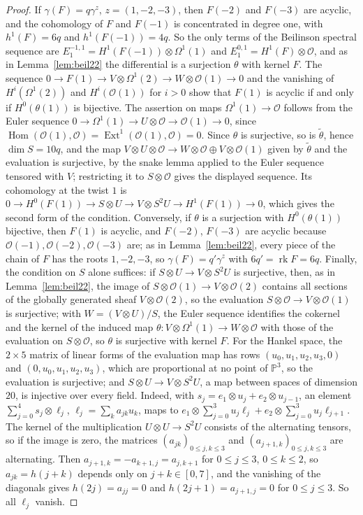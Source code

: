 \documentclass[11pt]{amsart}
\theoremstyle{definition}
\theoremstyle{remark}
\newcommand{\PP}{\mathbb{P}}
\newcommand{\OO}{\mathcal{O}}
\DeclareMathOperator{\rk}{rk}
\DeclareMathOperator{\Ext}{Ext}
\begin{document}
\begin{proof}
If $\gamma(F)=q\gamma^z$, $z=(1,-2,-3)$, then $F(-2)$ and $F(-3)$ are acyclic, and the cohomology of $F$ and $F(-1)$ is concentrated in degree one, with $h^1(F)=6q$ and $h^1(F(-1))=4q$. So the only terms of the Beilinson spectral sequence are $E_1^{-1,1}=H^1(F(-1))\otimes\Omega^1(1)$ and $E_1^{0,1}=H^1(F)\otimes\OO$, and as in Lemma~\ref{lem:beil22} the differential is a surjection $\theta$ with kernel $F$. The sequence $0\to F(1)\to V\otimes\Omega^1(2)\to W\otimes\OO(1)\to0$ and the vanishing of $H^i(\Omega^1(2))$ and $H^i(\OO(1))$ for $i>0$ show that $F(1)$ is acyclic if and only if $H^0(\theta(1))$ is bijective. The assertion on maps $\Omega^1(1)\to\OO$ follows from the Euler sequence $0\to\Omega^1(1)\to U\otimes\OO\to\OO(1)\to0$, since $\operatorname{Hom}(\OO(1),\OO)=\Ext^1(\OO(1),\OO)=0$. Since $\theta$ is surjective, so is $\tilde\theta$, hence $\dim S=10q$, and the map $V\otimes U\otimes\OO\to W\otimes\OO\oplus V\otimes\OO(1)$ given by $\tilde\theta$ and the evaluation is surjective, by the snake lemma applied to the Euler sequence tensored with $V$; restricting it to $S\otimes\OO$ gives the displayed sequence. Its cohomology at the twist $1$ is $0\to H^0(F(1))\to S\otimes U\to V\otimes S^2U\to H^1(F(1))\to0$, which gives the second form of the condition. Conversely, if $\theta$ is a surjection with $H^0(\theta(1))$ bijective, then $F(1)$ is acyclic, and $F(-2)$, $F(-3)$ are acyclic because $\OO(-1),\OO(-2),\OO(-3)$ are; as in Lemma~\ref{lem:beil22}, every piece of the chain of $F$ has the roots $1,-2,-3$, so $\gamma(F)=q'\gamma^z$ with $6q'=\rk F=6q$. Finally, the condition on $S$ alone suffices: if $S\otimes U\to V\otimes S^2U$ is surjective, then, as in Lemma~\ref{lem:beil22}, the image of $S\otimes\OO(1)\to V\otimes\OO(2)$ contains all sections of the globally generated sheaf $V\otimes\OO(2)$, so the evaluation $S\otimes\OO\to V\otimes\OO(1)$ is surjective; with $W=(V\otimes U)/S$, the Euler sequence identifies the cokernel and the kernel of the induced map $\theta\colon V\otimes\Omega^1(1)\to W\otimes\OO$ with those of the evaluation on $S\otimes\OO$, so $\theta$ is surjective with kernel $F$. For the Hankel space, the $2\times5$ matrix of linear forms of the evaluation map has rows $(u_0,u_1,u_2,u_3,0)$ and $(0,u_0,u_1,u_2,u_3)$, which are proportional at no point of $\PP^3$, so the evaluation is surjective; and $S\otimes U\to V\otimes S^2U$, a map between spaces of dimension $20$, is injective over every field. Indeed, with $s_j=e_1\otimes u_j+e_2\otimes u_{j-1}$, an element $\sum_{j=0}^4s_j\otimes\ell_j$, $\ell_j=\sum_ka_{jk}u_k$, maps to $e_1\otimes\sum_{j=0}^3u_j\ell_j+e_2\otimes\sum_{j=0}^3u_j\ell_{j+1}$. The kernel of the multiplication $U\otimes U\to S^2U$ consists of the alternating tensors, so if the image is zero, the matrices $(a_{jk})_{0\le j,k\le3}$ and $(a_{j+1,k})_{0\le j,k\le3}$ are alternating. Then $a_{j+1,k}=-a_{k+1,j}=a_{j,k+1}$ for $0\le j\le3$, $0\le k\le2$, so $a_{jk}=h(j+k)$ depends only on $j+k\in[0,7]$, and the vanishing of the diagonals gives $h(2j)=a_{jj}=0$ and $h(2j+1)=a_{j+1,j}=0$ for $0\le j\le3$. So all $\ell_j$ vanish.
\end{proof}
\end{document}
